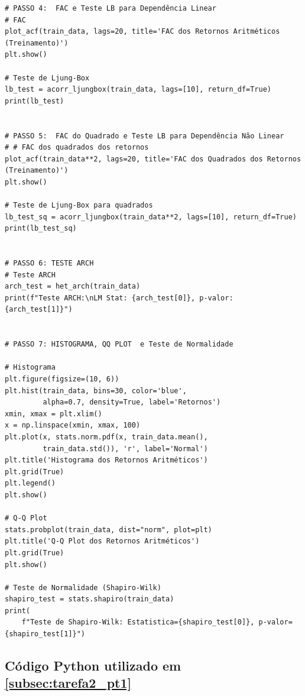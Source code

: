 \documentclass[a4paper, 12pt]{article}
\begin{document}
\begin{lstlisting}[style=python]
# PASSO 4:  FAC e Teste LB para Dependência Linear
# FAC
plot_acf(train_data, lags=20, title='FAC dos Retornos Aritméticos (Treinamento)')
plt.show()

# Teste de Ljung-Box
lb_test = acorr_ljungbox(train_data, lags=[10], return_df=True)
print(lb_test)


# PASSO 5:  FAC do Quadrado e Teste LB para Dependência Não Linear
# # FAC dos quadrados dos retornos
plot_acf(train_data**2, lags=20, title='FAC dos Quadrados dos Retornos (Treinamento)')
plt.show()

# Teste de Ljung-Box para quadrados
lb_test_sq = acorr_ljungbox(train_data**2, lags=[10], return_df=True)
print(lb_test_sq)


# PASSO 6: TESTE ARCH
# Teste ARCH
arch_test = het_arch(train_data)
print(f"Teste ARCH:\nLM Stat: {arch_test[0]}, p-valor: {arch_test[1]}")


# PASSO 7: HISTOGRAMA, QQ PLOT  e Teste de Normalidade

# Histograma
plt.figure(figsize=(10, 6))
plt.hist(train_data, bins=30, color='blue',
         alpha=0.7, density=True, label='Retornos')
xmin, xmax = plt.xlim()
x = np.linspace(xmin, xmax, 100)
plt.plot(x, stats.norm.pdf(x, train_data.mean(),
         train_data.std()), 'r', label='Normal')
plt.title('Histograma dos Retornos Aritméticos')
plt.grid(True)
plt.legend()
plt.show()

# Q-Q Plot
stats.probplot(train_data, dist="norm", plot=plt)
plt.title('Q-Q Plot dos Retornos Aritméticos')
plt.grid(True)
plt.show()

# Teste de Normalidade (Shapiro-Wilk)
shapiro_test = stats.shapiro(train_data)
print(
    f"Teste de Shapiro-Wilk: Estatistica={shapiro_test[0]}, p-valor={shapiro_test[1]}")

\end{lstlisting}

\subsection{Código Python utilizado em \ref{subsec:tarefa2_pt1}}\label{apendice:codigo_tarefa2_pt1}
\end{document}
